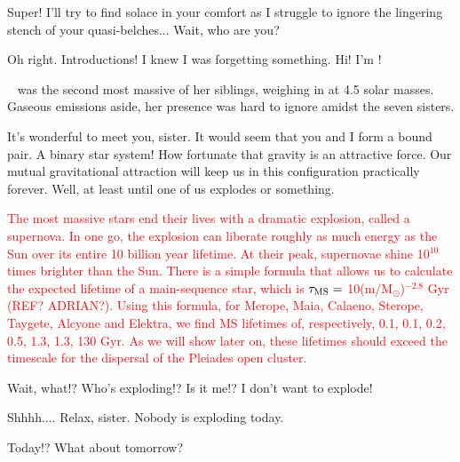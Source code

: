 \documentclass[main.tex]{subfiles}
\begin{document}
\par \Sterope Super!  I'll try to find solace in your comfort as I struggle to ignore the lingering stench of your quasi-belches...  Wait, who are you?

\par \Merope Oh right.  Introductions! I knew I was forgetting something.   Hi!  I'm \rmmerope!

\par \rmmerope~ was the second most massive of her siblings, weighing in at 4.5 solar masses.  Gaseous emissions aside, her presence was hard to ignore amidst the seven sisters.  

\par \Maia It's wonderful to meet you, sister.  It would seem that you and I form a bound pair.  A binary star system!  How fortunate that gravity is an attractive force.  Our mutual gravitational attraction will keep us in this configuration practically forever.  Well, at least until one of us explodes or something.

\begin{tcolorbox}[sharp corners, colback=red!30, colframe=red!80!blue, title=Supernovae and Stellar Lifetimes]
\par \textcolor{red} {\nar The most massive stars end their lives with a dramatic explosion, called a supernova.  In one go, the explosion can liberate roughly as much energy as the Sun over its entire 10 billion year lifetime.  At their peak, supernovae shine 10$^{10}$ times brighter than the Sun.  There is a simple formula that allows us to calculate the expected lifetime of a main-sequence star, which is $\tau_{\rm MS} =$ 10(m/M$_{\odot}$)$^{-2.8}$ Gyr (REF? ADRIAN?).  Using this formula, for Merope, Maia, Calaeno, Sterope, Taygete, Alcyone and Elektra, we find MS lifetimes of, respectively, 0.1, 0.1, 0.2, 0.5, 1.3, 1.3, 130 Gyr.  As we will show later on, these lifetimes should exceed the timescale for the dispersal of the Pleiades open cluster.}
\end{tcolorbox}

\par \Merope Wait, what!?  Who's exploding!?  Is it me!?  I don't want to explode!

\par \Maia Shhhh....  Relax, sister.  Nobody is exploding today.  

\par \Merope Today!?  What about tomorrow?  
\end{document}
